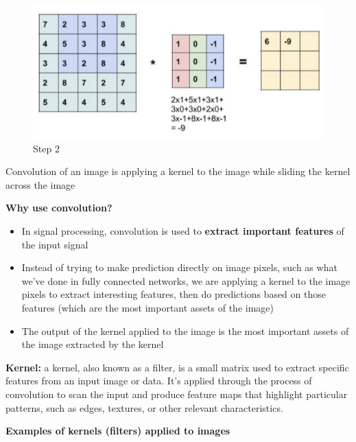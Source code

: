 \begin{figure}[h!t]
    \centering
    \includegraphics[width=0.525\linewidth]{convex2.png}
    \caption{Step 2}
    \label{fig:enter-label}
\end{figure}

\begin{idea}
    Convolution of an image is applying a kernel to the image while sliding the kernel across the image
\end{idea}


\textbf{Why use convolution?}
\begin{itemize}
    \item In signal processing, convolution is used to \textbf{extract important features} of the input signal
    \item Instead of trying to make prediction directly on image pixels, such as what we've done in fully connected networks, we are applying a kernel to the image pixels to extract interesting features, then do predictions based on those features (which are the most important assets of the image)
    \item The output of the kernel applied to the image is the most important assets of the image extracted by the kernel\\
\end{itemize}

\begin{definition}
    \textbf{Kernel:} a kernel, also known as a filter, is a small matrix used to extract specific features from an input image or data. It's applied through the process of convolution to scan the input and produce feature maps that highlight particular patterns, such as edges, textures, or other relevant characteristics. 
\end{definition}

\noindent\textbf{Examples of kernels (filters) applied to images}

